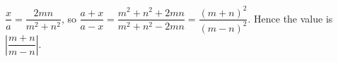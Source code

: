 $\dfrac xa=\dfrac{2mn}{m^2+n^2}$, so $\dfrac{a+x}{a-x}=\dfrac{m^2+n^2+2mn}{m^2+n^2-2mn}=\dfrac{(m+n)^2}{(m-n)^2}$. Hence the value is $\boxed{\left|\dfrac{m+n}{m-n}\right|}$.
